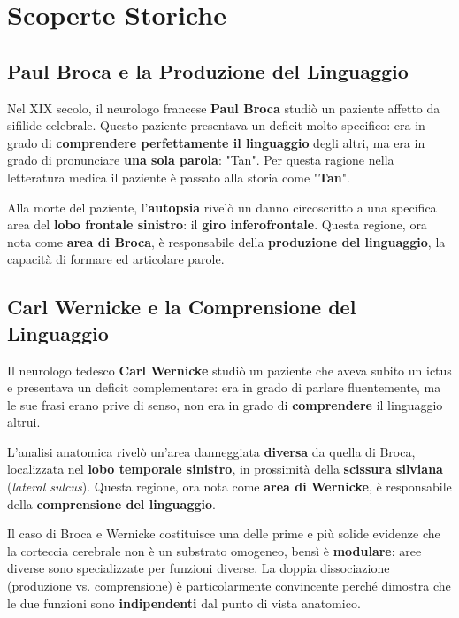 \section{Scoperte Storiche}

\subsection{Paul Broca e la Produzione del Linguaggio}

Nel XIX secolo, il neurologo francese \textbf{Paul Broca} studiò un paziente affetto da sifilide celebrale. Questo paziente presentava un deficit molto specifico: era in grado di \textbf{comprendere perfettamente il linguaggio} degli altri, ma era in grado di pronunciare \textbf{una sola parola}: "Tan". Per questa ragione nella letteratura medica il paziente è passato alla storia come "\textbf{Tan}".

Alla morte del paziente, l'\textbf{autopsia} rivelò un danno circoscritto a una specifica area del \textbf{lobo frontale sinistro}: il \textbf{giro inferofrontale}. Questa regione, ora nota come \textbf{area di Broca}, è responsabile della \textbf{produzione del linguaggio}, la capacità di formare ed articolare parole.

\subsection{Carl Wernicke e la Comprensione del Linguaggio}

Il neurologo tedesco \textbf{Carl Wernicke} studiò un paziente che aveva subito un ictus e presentava un deficit complementare: era in grado di parlare fluentemente, ma le sue frasi erano prive di senso, non era in grado di \textbf{comprendere} il linguaggio altrui.

L'analisi anatomica rivelò un'area danneggiata \textbf{diversa} da quella di Broca, localizzata nel \textbf{lobo temporale sinistro}, in prossimità della \textbf{scissura silviana} (\textit{lateral sulcus}). Questa regione, ora nota come \textbf{area di Wernicke}, è responsabile della \textbf{comprensione del linguaggio}.

\begin{tcolorbox}[colback=gray!5, colframe=gray!40, arc=2mm, boxrule=0.5pt]
 Il caso di Broca e Wernicke costituisce una delle prime e più solide evidenze che la corteccia cerebrale non è un substrato omogeneo, bensì è \textbf{modulare}: aree diverse sono specializzate per funzioni diverse. La doppia dissociazione (produzione vs. comprensione) è particolarmente convincente perché dimostra che le due funzioni sono \textbf{indipendenti} dal punto di vista anatomico.
\end{tcolorbox}



